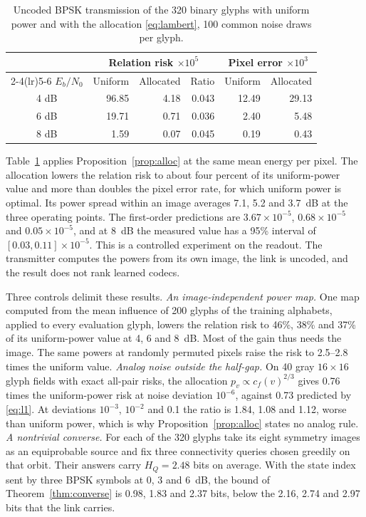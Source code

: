 \documentclass[10pt,conference]{IEEEtran}
\begin{document}
\begin{table}[t]\centering
\caption{Uncoded BPSK transmission of the 320 binary glyphs with uniform power and with the allocation \eqref{eq:lambert}, 100 common noise draws per glyph.}\label{tab:alloc}
\begin{tabular}{crrrrr}\toprule
 & \multicolumn{3}{c}{Relation risk $\times10^{5}$} & \multicolumn{2}{c}{Pixel error $\times10^{3}$}\\\cmidrule(lr){2-4}\cmidrule(lr){5-6}
$E_b/N_0$ & Uniform & Allocated & Ratio & Uniform & Allocated\\\midrule
4 dB & 96.85 & 4.18 & 0.043 & 12.49 & 29.13\\
6 dB & 19.71 & 0.71 & 0.036 & 2.40 & 5.48\\
8 dB & 1.59 & 0.07 & 0.045 & 0.19 & 0.43\\\bottomrule
\end{tabular}\end{table}
Table~\ref{tab:alloc} applies Proposition~\ref{prop:alloc} at the same mean energy per pixel. The allocation lowers the relation risk to about four percent of its uniform-power value and more than doubles the pixel error rate, for which uniform power is optimal. Its power spread within an image averages 7.1, 5.2 and 3.7~dB at the three operating points. The first-order predictions are $3.67\times10^{-5}$, $0.68\times10^{-5}$ and $0.05\times10^{-5}$, and at 8~dB the measured value has a 95\% interval of $[0.03,0.11]\times10^{-5}$. This is a controlled experiment on the readout. The transmitter computes the powers from its own image, the link is uncoded, and the result does not rank learned codecs.

Three controls delimit these results. \emph{An image-independent power map.} One map computed from the mean influence of 200 glyphs of the training alphabets, applied to every evaluation glyph, lowers the relation risk to 46\%, 38\% and 37\% of its uniform-power value at 4, 6 and 8~dB. Most of the gain thus needs the image. The same powers at randomly permuted pixels raise the risk to 2.5--2.8 times the uniform value. \emph{Analog noise outside the half-gap.} On 40 gray $16\times16$ glyph fields with exact all-pair risks, the allocation $p_v\propto c_f(v)^{2/3}$ gives 0.76 times the uniform-power risk at noise deviation $10^{-6}$, against 0.73 predicted by \eqref{eq:l1}. At deviations $10^{-3}$, $10^{-2}$ and 0.1 the ratio is 1.84, 1.08 and 1.12, worse than uniform power, which is why Proposition~\ref{prop:alloc} states no analog rule. \emph{A nontrivial converse.} For each of the 320 glyphs take its eight symmetry images as an equiprobable source and fix three connectivity queries chosen greedily on that orbit. Their answers carry $H_Q=2.48$ bits on average. With the state index sent by three BPSK symbols at 0, 3 and 6~dB, the bound of Theorem~\ref{thm:converse} is 0.98, 1.83 and 2.37 bits, below the 2.16, 2.74 and 2.97 bits that the link carries.
\end{document}
